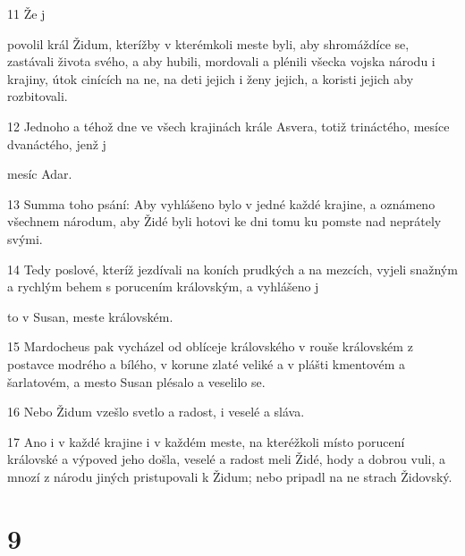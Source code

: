 \par 11 Že j\par povolil král Židum, kterížby v kterémkoli meste byli, aby shromáždíce se, zastávali života svého, a aby hubili, mordovali a plénili všecka vojska národu i krajiny, útok cinících na ne, na deti jejich i ženy jejich, a koristi jejich aby rozbitovali.
\par 12 Jednoho a téhož dne ve všech krajinách krále Asvera, totiž trináctého, mesíce dvanáctého, jenž j\par mesíc Adar.
\par 13 Summa toho psání: Aby vyhlášeno bylo v jedné každé krajine, a oznámeno všechnem národum, aby Židé byli hotovi ke dni tomu ku pomste nad neprátely svými.
\par 14 Tedy poslové, kteríž jezdívali na koních prudkých a na mezcích, vyjeli snažným a rychlým behem s porucením královským, a vyhlášeno j\par to v Susan, meste královském.
\par 15 Mardocheus pak vycházel od oblíceje královského v rouše královském z postavce modrého a bílého, v korune zlaté veliké a v plášti kmentovém a šarlatovém, a mesto Susan plésalo a veselilo se.
\par 16 Nebo Židum vzešlo svetlo a radost, i veselé a sláva.
\par 17 Ano i v každé krajine i v každém meste, na kteréžkoli místo porucení královské a výpoved jeho došla, veselé a radost meli Židé, hody a dobrou vuli, a mnozí z národu jiných pristupovali k Židum; nebo pripadl na ne strach Židovský.

\chapter{9}

